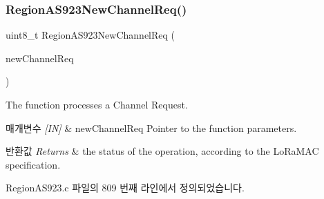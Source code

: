 \subsubsection{\texorpdfstring{Region\+A\+S923\+New\+Channel\+Req()}{RegionAS923NewChannelReq()}}
{\footnotesize\ttfamily uint8\+\_\+t Region\+A\+S923\+New\+Channel\+Req (\begin{DoxyParamCaption}\item[{\mbox{\hyperlink{group___r_e_g_i_o_n_gae2abcdb6dbb843c9faf5fd3009eca9d6}{New\+Channel\+Req\+Params\+\_\+t}} $\ast$}]{new\+Channel\+Req }\end{DoxyParamCaption})}



The function processes a Channel Request. 


\begin{DoxyParams}{매개변수}
{\em \mbox{[}\+I\+N\mbox{]}} & new\+Channel\+Req Pointer to the function parameters.\\
\hline
\end{DoxyParams}

\begin{DoxyRetVals}{반환값}
{\em Returns} & the status of the operation, according to the Lo\+Ra\+M\+AC specification. \\
\hline
\end{DoxyRetVals}


Region\+A\+S923.\+c 파일의 809 번째 라인에서 정의되었습니다.


